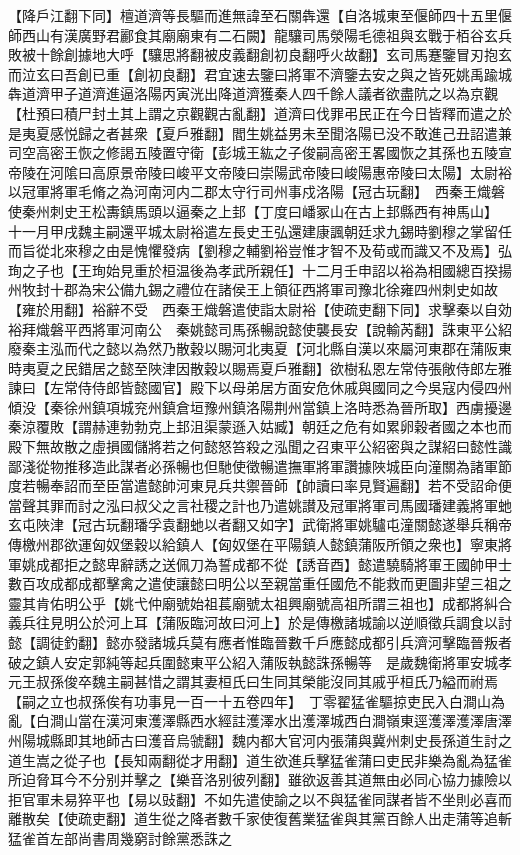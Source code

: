 【降戶江翻下同】檀道濟等長驅而進無諱至石關犇還【自洛城東至偃師四十五里偃師西山有漢廣野君酈食其廟廟東有二石闕】龍驤司馬滎陽毛德祖與玄戰于栢谷玄兵敗被十餘創據地大呼【驤思將翻被皮義翻創初良翻呼火故翻】玄司馬蹇鑒冒刃抱玄而泣玄曰吾創已重【創初良翻】君宜速去鑒曰將軍不濟鑒去安之與之皆死姚禹踰城犇道濟甲子道濟進逼洛陽丙寅洸出降道濟獲秦人四千餘人議者欲盡阬之以為京觀【杜預曰積尸封土其上謂之京觀觀古亂翻】道濟曰伐罪弔民正在今日皆釋而遣之於是夷夏感悦歸之者甚衆【夏戶雅翻】閻生姚益男未至聞洛陽已没不敢進己丑詔遣兼司空高密王恢之修謁五陵置守衛【彭城王紘之子俊嗣高密王畧國恢之其孫也五陵宣帝陵在河隂曰高原景帝陵曰峻平文帝陵曰崇陽武帝陵曰峻陽惠帝陵曰太陽】太尉裕以冠軍將軍毛脩之為河南河内二郡太守行司州事戍洛陽【冠古玩翻】　西秦王熾磐使秦州刺史王松夀鎮馬頭以逼秦之上邽【丁度曰嶓冢山在古上邽縣西有神馬山】　十一月甲戌魏主嗣還平城太尉裕遣左長史王弘還建康諷朝廷求九錫時劉穆之掌留任而旨從北來穆之由是愧懼發病【劉穆之輔劉裕豈惟才智不及荀或而識又不及焉】弘珣之子也【王珣始見重於桓温後為孝武所親任】十二月壬申詔以裕為相國總百揆揚州牧封十郡為宋公備九錫之禮位在諸侯王上領征西將軍司豫北徐雍四州刺史如故【雍於用翻】裕辭不受　西秦王熾磐遣使詣太尉裕【使疏吏翻下同】求擊秦以自効裕拜熾磐平西將軍河南公　秦姚懿司馬孫暢說懿使襲長安【說輸芮翻】誅東平公紹廢秦主泓而代之懿以為然乃散穀以賜河北夷夏【河北縣自漢以來屬河東郡在蒲阪東時夷夏之民錯居之懿至陜津因散穀以賜焉夏戶雅翻】欲樹私恩左常侍張敞侍郎左雅諫曰【左常侍侍郎皆懿國官】殿下以母弟居方面安危休戚與國同之今吳寇内侵四州傾没【秦徐州鎮項城兖州鎮倉垣豫州鎮洛陽荆州當鎮上洛時悉為晉所取】西虜擾邊秦涼覆敗【謂赫連勃勃克上邽沮渠蒙遜入姑臧】朝廷之危有如累卵穀者國之本也而殿下無故散之虛損國儲將若之何懿怒笞殺之泓聞之召東平公紹密與之謀紹曰懿性識鄙淺從物推移造此謀者必孫暢也但馳使徵暢遣撫軍將軍讚據陜城臣向潼關為諸軍節度若暢奉詔而至臣當遣懿帥河東見兵共禦晉師【帥讀曰率見賢遍翻】若不受詔命便當聲其罪而討之泓曰叔父之言社稷之計也乃遣姚讃及冠軍將軍司馬國璠建義將軍虵玄屯陜津【冠古玩翻璠孚袁翻虵以者翻又如字】武衛將軍姚驢屯潼關懿遂舉兵稱帝傳檄州郡欲運匈奴堡穀以給鎮人【匈奴堡在平陽鎮人懿鎮蒲阪所領之衆也】寧東將軍姚成都拒之懿卑辭誘之送佩刀為誓成都不從【誘音酉】懿遣驍騎將軍王國帥甲士數百攻成都成都擊禽之遣使讓懿曰明公以至親當重任國危不能救而更圖非望三祖之靈其肯佑明公乎【姚弋仲廟號始祖萇廟號太祖興廟號高祖所謂三祖也】成都將糾合義兵往見明公於河上耳【蒲阪臨河故曰河上】於是傳檄諸城諭以逆順徵兵調食以討懿【調徒釣翻】懿亦發諸城兵莫有應者惟臨晉數千戶應懿成都引兵濟河擊臨晉叛者破之鎮人安定郭純等起兵圍懿東平公紹入蒲阪執懿誅孫暢等　是歲魏衛將軍安城孝元王叔孫俊卒魏主嗣甚惜之謂其妻桓氏曰生同其榮能沒同其戚乎桓氏乃縊而祔焉【嗣之立也叔孫俟有功事見一百一十五卷四年】　丁零翟猛雀驅掠吏民入白澗山為亂【白澗山當在漢河東濩澤縣西水經註濩澤水出濩澤城西白澗嶺東逕濩澤濩澤唐澤州陽城縣即其地師古曰濩音烏虢翻】魏内都大官河内張蒲與冀州刺史長孫道生討之道生嵩之從子也【長知兩翻從才用翻】道生欲進兵擊猛雀蒲曰吏民非樂為亂為猛雀所迫脅耳今不分别并擊之【樂音洛别彼列翻】雖欲返善其道無由必同心協力據險以拒官軍未易猝平也【易以䜴翻】不如先遣使諭之以不與猛雀同謀者皆不坐則必喜而離散矣【使疏吏翻】道生從之降者數千家使復舊業猛雀與其黨百餘人出走蒲等追斬猛雀首左部尚書周幾窮討餘黨悉誅之

